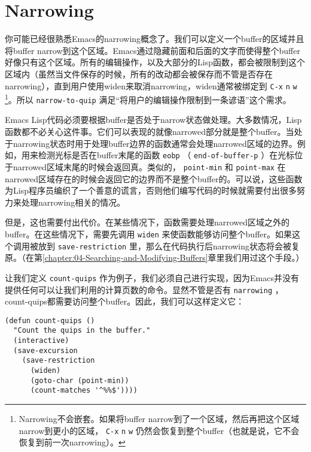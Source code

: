 \section{Narrowing}
\label{section:09-Narrowing}

你可能已经很熟悉Emacs的narrowing概念了。我们可以定义一个buffer的区域并且将buffer narrow到这个区域。Emacs通过隐藏前面和后面的文字而使得整个buffer好像只有这个区域。所有的编辑操作，以及大部分的Lisp函数，都会被限制到这个区域内（虽然当文件保存的时候，所有的改动都会被保存而不管是否存在narrowing），直到用户使用widen来取消narrowing，widen通常被绑定到 \verb|C-x| \verb|n| \verb|w| \footnote{Narrowing不会嵌套。如果将buffer narrow到了一个区域，然后再把这个区域narrow到更小的区域， \texttt{C-x} \texttt{n} \texttt{w} 仍然会恢复到整个buffer（也就是说，它不会恢复到前一次narrowing）。}。所以 \texttt{narrow-to-quip} 满足“将用户的编辑操作限制到一条谚语”这个需求。

Emacs Lisp代码必须要根据buffer是否处于narrow状态做处理。大多数情况，Lisp函数都不必关心这件事。它们可以表现的就像narrowed部分就是整个buffer。当处于narrowing状态时用于处理buffer边界的函数通常会处理narrowed区域的边界。例如，用来检测光标是否在buffer末尾的函数 \texttt{eobp} （ \texttt{end-of-buffer-p} ）在光标位于narrowed区域末尾的时候会返回真。类似的， \texttt{point-min} 和 \texttt{point-max} 在narrowed区域存在的时候会返回它的边界而不是整个buffer的。可以说，这些函数为Lisp程序员编织了一个善意的谎言，否则他们编写代码的时候就需要付出很多努力来处理narrowing相关的情况。

但是，这也需要付出代价。在某些情况下，函数需要处理narrowed区域之外的buffer。在这些情况下，需要先调用 \texttt{widen} 来使函数能够访问整个buffer。如果这个调用被放到 \texttt{save-restriction} 里，那么在代码执行后narrowing状态将会被复原。（在第\ref{chapter:04-Searching-and-Modifying-Buffers}章里我们用过这个手段。）

让我们定义 \texttt{count-quips} 作为例子，我们必须自己进行实现，因为Emacs并没有提供任何可以让我们利用的计算页数的命令。显然不管是否有 \texttt{narrowing} ，count-quips都需要访问整个buffer。因此，我们可以这样定义它：

\begin{verbatim}
(defun count-quips ()
  "Count the quips in the buffer."
  (interactive)
  (save-excursion
    (save-restriction
      (widen)
      (goto-char (point-min))
      (count-matches '^%%$'))))
\end{verbatim}


